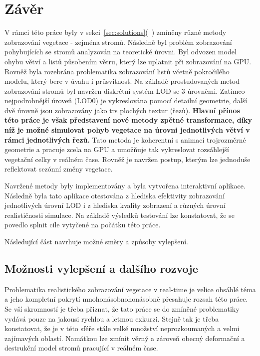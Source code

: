\chapter{Závěr}
\label{chap:zaver}
\begin{comment}
Prostudujte existující metody pro realistické zobrazování modelů vegetace v reálném čase a simulaci vybraných jevů jako je pohyb vegetace vlivem větru a změny vegetace v rámci různých ročních období. Na základě nastudovaných metod navrhněte a implementujte software umožňující realistické zobrazování vegetace v reálném čase s podporou zobrazování rozsáhlejších vegetačních celků. Výslednou implementaci otestujte z hlediska efektivity pro různé úrovně realističnosti simulace a zobrazování.
\end{comment}

V rámci této práce byly v sekci~\ref{sec:solutions}(~) zmíněny různé metody zobrazování vegetace - zejména stromů. Následně byl problém zobrazování pohybujících se stromů analyzován na teoretické úrovni. Byl odvozen model ohybu větví a listů působením větru, který lze uplatnit při zobrazování na GPU. Rovněž byla rozebrána problematika zobrazování listů včetně pokročilého modelu, který bere v úvahu i průsvitnost. Na základě prostudovaných metod zobrazování stromů byl navržen diskrétní systém LOD se 3 úrovněmi. Zatímco nejpodrobnější úroveň (LOD0) je vykreslována pomocí detailní geometrie, další dvě úrovně jsou zobrazovány jako trs plochých textur (řezů). {\bf Hlavní přínos této práce je však představení nové metody zpětné transformace, díky níž je možné simulovat pohyb vegetace na úrovni jednotlivých větví v rámci jednotlivých řezů.} Tato metoda je koherentní s animací trojrozměrné geometrie a pracuje zcela na GPU a umožňuje tak vykreslovat rozsáhlejší vegetační celky v reálném čase. Rovněž je navržen postup, kterým lze jednoduše reflektovat sezónní změny vegetace.

Navržené metody byly implementovány a byla vytvořena interaktivní aplikace. Následně byla tato aplikace otestována z hlediska efektivity zobrazování jednotlivých úrovní LOD i z hlediska kvality zobrazení a různých úrovní realističnosti simulace. Na základě výsledků testování lze konstatovat, že se povedlo splnit cíle vytyčené na počátku této práce.

Následující část navrhuje možné směry a způsoby vylepšení. 

\section{Možnosti vylepšení a dalšího rozvoje}
Problematika realistického zobrazování vegetace v real-time je velice obsáhlé téma a jeho kompletní pokrytí mnohonásobnohonásobně přesahuje rozsah této práce. Se vší skromností je třeba přiznat, že tato práce se do zmíněné problematiky vydává pouze na jakousi rychlou a letmou exkurzi. Stejně tak je třeba konstatovat, že je v této sféře stále velké množství neprozkoumaných a velmi zajímavých oblastí. Namátkou lze zmínit věrný a zároveň obecný deformační a destrukční model stromů pracující v reálném čase. 

